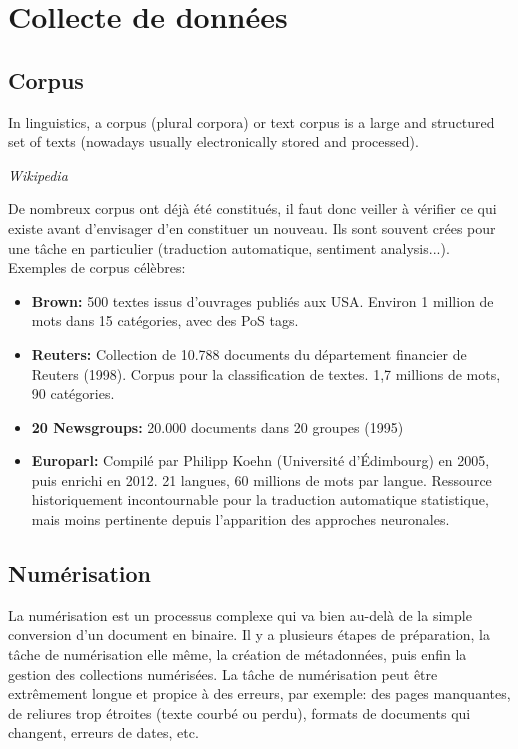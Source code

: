 \vspace{-1.2cm}

\section{Collecte de données}

\subsection{Corpus}

\epigraph{In linguistics, a corpus (plural corpora) or text corpus is a large and structured\\ set of texts (nowadays usually electronically stored and processed).}{\textit{Wikipedia}}

De nombreux corpus ont déjà été constitués, il faut donc veiller à vérifier ce qui existe avant d'envisager d'en constituer un nouveau.
Ils sont souvent crées pour une tâche en particulier (traduction automatique, sentiment analysis...).\\

Exemples de corpus célèbres:\\
\begin{itemize}
    \item \textbf{Brown:} 500 textes issus d'ouvrages publiés aux USA. Environ 1 million de mots dans 15 catégories, avec des PoS tags.
    \item \textbf{Reuters:} Collection de 10.788 documents du département financier de Reuters (1998). Corpus pour la classification de textes. 1,7 millions de mots, 90 catégories.
    \item \textbf{20 Newsgroups:} 20.000 documents dans 20 groupes (1995)
    \item \textbf{Europarl:} Compilé par Philipp Koehn (Université d'Édimbourg) en 2005, puis enrichi en 2012. 21 langues, 60 millions de mots par langue.
    Ressource historiquement incontournable pour la traduction automatique statistique, mais moins pertinente depuis l'apparition des approches neuronales.
\end{itemize}

\subsection{Numérisation}

La numérisation est un processus complexe qui va bien au-delà de la simple conversion d'un document en binaire.
Il y a plusieurs étapes de préparation, la tâche de numérisation elle même, la création de métadonnées, puis enfin la gestion des collections numérisées.
La tâche de numérisation peut être extrêmement longue et propice à des erreurs, par exemple:
des pages manquantes, de reliures trop étroites (texte courbé ou perdu), formats de documents qui changent, erreurs de dates, etc.\\

